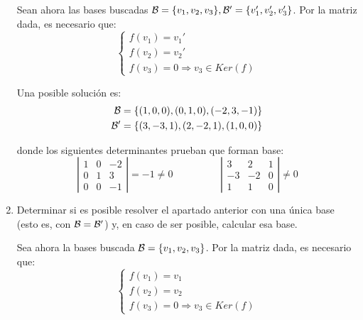 \documentclass[12pt]{article}
\begin{document}
\begin{ejercicio}
\begin{enumerate}
        Sean ahora las bases buscadas $\mathcal{B}=\{v_1,v_2,v_3\}, \mathcal{B}'=\{v_1',v_2',v_3'\}$. Por la matriz dada, es necesario que:
        \begin{equation*}
            \left\{\begin{array}{c}
                f(v_1)=v_1' \\
                f(v_2)=v_2' \\
                f(v_3)=0 \Longrightarrow v_3\in Ker(f)
            \end{array}\right.
        \end{equation*}

        Una posible solución es:
        \begin{equation*}\begin{split}
            \mathcal{B}&=\{(1,0,0), (0,1,0), (-2,3,-1)\} \\
            \mathcal{B}'&=\{(3, -3, 1), (2, -2, 1), (1,0,0)\}
        \end{split}\end{equation*}

        donde los siguientes determinantes prueban que forman base:
        \begin{equation*}
            \left|\begin{array}{ccc}
                1 & 0 & -2 \\
                0 & 1 & 3 \\
                0 & 0 & -1
            \end{array}\right| = -1\neq 0 \hspace{2cm}
            \left|\begin{array}{ccc}
                3 & 2 & 1 \\
                -3 & -2 & 0 \\
                1 & 1 & 0
            \end{array}\right| \neq 0
        \end{equation*}

        \item Determinar si es posible resolver el apartado anterior con una única base (esto es, con $\mathcal{B}=\mathcal{B}'$) y, en caso de ser posible, calcular esa base.

        Sea ahora la bases buscada $\mathcal{B}=\{v_1,v_2,v_3\}$. Por la matriz dada, es necesario que:
        \begin{equation*}
            \left\{\begin{array}{c}
                f(v_1)=v_1 \\
                f(v_2)=v_2 \\
                f(v_3)=0 \Longrightarrow v_3\in Ker(f)
            \end{array}\right.
        \end{equation*}


\end{enumerate}
\end{ejercicio}
\end{document}
